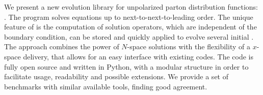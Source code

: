 We present a new \qcd{} evolution library for unpolarized parton
distribution functions: \eko{}.
The program solves \dglap{} equations up to next-to-next-to-leading order.
The unique feature of \eko{} is the computation of solution operators,
which are independent of the boundary condition, can be stored
and quickly applied to evolve several initial \pdfs.
The \eko{} approach combines the power of $N$-space solutions with the
flexibility of a $x$-space delivery, that allows for an easy
interface with existing codes.
The code is fully open source and written in Python, with a modular
structure in order to facilitate usage, readability and possible
extensions.
We provide a set of benchmarks with similar available tools, finding good
agreement.

